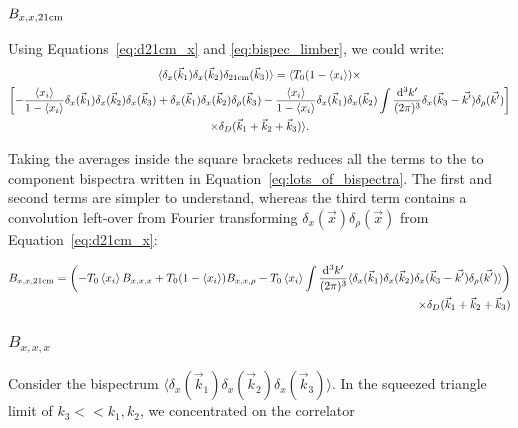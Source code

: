 \subsubsection{$B_{x,x,\rm 21cm}$}
\label{subsec:B_xx21}
Using Equations~\ref{eq:d21cm_x} and \ref{eq:bispec_limber}, we could write:
\begin{multline}
\langle \delta_x(\vec{k}_1) \delta_x(\vec{k}_2) \delta_{{\rm 21cm}}(\vec{k}_3) \rangle = 
\langle
T_0(1- \left\langle x_i \right\rangle ) \times \\
\left[
- \frac{\left\langle x_i \right\rangle}{1 - \left\langle x_i \right\rangle} \delta_x(\vec{k}_1) \delta_x(\vec{k}_2) \delta_x(\vec{k}_3) + \delta_x(\vec{k}_1) \delta_x(\vec{k}_2) \delta_{\rho}(\vec{k}_3) 
 - \frac{\left\langle x_i \right\rangle}{1 - \left\langle x_i \right\rangle} \delta_x(\vec{k}_1) \delta_x(\vec{k}_2) \int \frac{{\rm d^3}k'}{(2\pi)^3} \delta_x(\vec{k}_3 - \vec{k'})\delta_{\rho}(\vec{k'})
\right] \\
\times \delta_D(\vec{k}_1+\vec{k}_2+\vec{k}_3) 
\rangle .
\label{eq:B_xx21}
\end{multline}

Taking the averages inside the square brackets reduces all the terms to the to component bispectra written in Equation~\ref{eq:lots_of_bispectra}. The first and second terms are simpler to understand, whereas the third term contains a convolution left-over from Fourier transforming $\delta_x(\vec{x})\delta_{\rho}(\vec{x})$ from Equation~\ref{eq:d21cm_x}:

\begin{equation}
\begin{split}
B_{x,x,{\rm 21cm}} = \left( -T_0 \left\langle x_i \right\rangle B_{x,x,x} + T_0(1-\left\langle x_i \right\rangle) B_{x,x,\rho} - T_0 \left\langle x_i \right\rangle \int \frac{{\rm d^3}k'}{(2\pi)^3}
\langle \delta_x(\vec{k}_1) \delta_x(\vec{k}_2) \delta_x(\vec{k}_3 - \vec{k'})\delta_{\rho}(\vec{k'}) \rangle \right)\\
\times \delta_D(\vec{k}_1+\vec{k}_2+\vec{k}_3)
\end{split}
\end{equation}

\subsubsection*{$B_{x,x,x}$}
\label{subsubsec:Bxxx}
Consider the bispectrum $\langle\delta_x(\vec{k}_1)\delta_x(\vec{k}_2)\delta_x(\vec{k}_3)\rangle$. In the squeezed triangle limit of $k_3 << k_1, k_2$, we concentrated on the correlator

